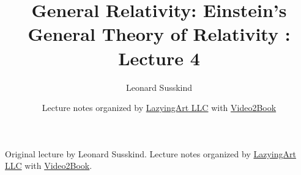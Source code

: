 \documentclass[11pt,oneside]{book}
\begin{document}
\frontmatter
\title{General Relativity: Einstein's General Theory of Relativity : Lecture 4}
\author{Leonard Susskind}
\date{Lecture notes organized by \href{https://lazying.art}{LazyingArt LLC} with \href{https://github.com/lachlanchen/Video2Book}{Video2Book}}
\maketitle
\begin{center}
\small Original lecture by Leonard Susskind. Lecture notes organized by \href{https://lazying.art}{LazyingArt LLC} with \href{https://github.com/lachlanchen/Video2Book}{Video2Book}.
\end{center}
\clearpage
\mainmatter

\end{document}
